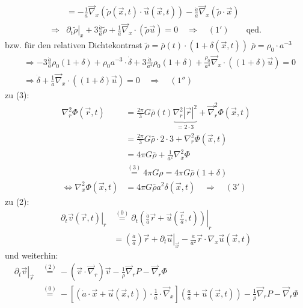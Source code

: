 \begin{itemize}
\begin{align*}
			&=-\frac{1}{a}\vec{\nabla}_x\left(\tilde{\rho}(\vec{x},t)\cdot\vec{u}(\vec{x},t)\right)-\frac{\dot{a}}{a}\vec{\nabla}_x(\tilde{\rho}\cdot\vec{x})\\
			\Rightarrow &\left.\partial_t\tilde{\rho}\right|_x+3\frac{\dot{a}}{a}\tilde{\rho}+\frac{1}{a}\vec{\nabla}_x\cdot\left(\tilde{\rho}\vec{u}\right)=0 \quad \Rightarrow \quad (1') \qquad \text{qed.}
		\end{align*}
		bzw. für den relativen Dichtekontrast $\tilde{\rho}=\bar{\rho}(t)\cdot\left(1+\delta(\vec{x},t)\right)$ $\bar{\rho}=\rho_0\cdot a^{-3}$
		\begin{align*}
			&\Rightarrow -3\frac{\dot{a}}{a}\rho_0(1+\delta)+\rho_0a^{-3}\cdot\dot{\delta}+3\frac{\dot{a}}{a^4}\rho_0(1+\delta)+\frac{\rho_0}{a^4}\vec{\nabla}_x\cdot\left((1+\delta)\vec{u}\right)=0\\
			&\Rightarrow \dot{\delta}+\frac{1}{a}\vec{\nabla}_x\cdot\left((1+\delta)\vec{u}\right)=0 \quad \Rightarrow \quad (1'')
		\end{align*}
		zu (3):
		\begin{align*}
			\nabla_r^2\Phi(\vec{r},t)&=\frac{2\pi}{3}G\bar{\rho}(t)\underset{=2\cdot 3}{\underbrace{\nabla_r^2\left|\vec{r}\right|^2}}+\vec{\nabla}_r^2\Phi(\vec{x},t)\\
			&=\frac{2\pi}{3}G\bar{\rho}\cdot 2\cdot 3 + \nabla^2_r\Phi(\vec{x},t)\\
			&=4\pi G\bar{\rho}+\frac{1}{a^2}\nabla_x^2\Phi\\
			&\overset{(3)}{=}4\pi G\rho=4\pi G\bar{\rho}(1+\delta)\\
			\Leftrightarrow \nabla^2_x\Phi(\vec{x},t)&=4\pi G\bar{\rho}a^2\delta(\vec{x},t) \quad \Rightarrow \quad (3')
		\end{align*}
		zu (2):
		\begin{align*}
			\left.\partial_t\vec{v}(\vec{r},t)\right|_r&\overset{(0)}{=}\left.\partial_t\left(\frac{\ddot{a}}{a}\vec{r}+\vec{u}\left(\frac{\vec{r}}{a},t\right)\right)\right|_r\\
			&=\left(\frac{\dot{a}}{a}\right)\vec{r}+\left.\partial_t\vec{u}\right|_{\vec{x}}-\frac{\dot{a}}{a^2}\vec{r}\cdot\nabla_x\vec{u}(\vec{x},t)
		\end{align*}
		und weiterhin:
		\begin{align*}
			\left.\partial_t\vec{v}\right|_{\vec{r}}&\overset{(2)}{=}-\left(\vec{v}\cdot\vec{\nabla}_r\right)\vec{v}-\frac{1}{\rho}\vec{\nabla}_rP-\vec{\nabla}_r\Phi\\
			&\overset{(0)}{=}-\left[\left(\dot{a}\cdot\vec{x}+\vec{u}(\vec{x},t)\right)\cdot\frac{1}{a}\cdot\vec{\nabla}_x\right]\left(\frac{\dot{a}}{a}+\vec{u}(\vec{x},t)\right)-\frac{1}{\rho}\vec{\nabla}_rP-\vec{\nabla}_r\Phi\\

\end{align*}
\end{itemize}
